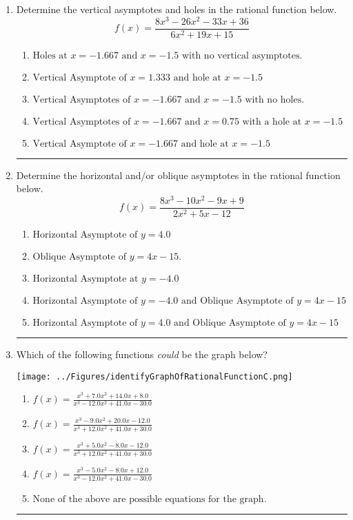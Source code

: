 \documentclass[14pt]{extbook}
\newcommand{\litem}[1]{\item#1\hspace*{-1cm}\rule{\textwidth}{0.4pt}}
\begin{document}
\begin{enumerate}
{\begin{enumerate}[label=\Alph*.]
\end{enumerate} }
\litem{
Determine the vertical asymptotes and holes in the rational function below.\[ f(x) = \frac{8x^{3} -26 x^{2} -33 x + 36}{6x^{2} +19 x + 15} \]\begin{enumerate}[label=\Alph*.]
\item \( \text{Holes at } x = -1.667 \text{ and } x = -1.5 \text{ with no vertical asymptotes.} \)
\item \( \text{Vertical Asymptote of } x = 1.333 \text{ and hole at } x = -1.5 \)
\item \( \text{Vertical Asymptotes of } x = -1.667 \text{ and } x = -1.5 \text{ with no holes.} \)
\item \( \text{Vertical Asymptotes of } x = -1.667 \text{ and } x = 0.75 \text{ with a hole at } x = -1.5 \)
\item \( \text{Vertical Asymptote of } x = -1.667 \text{ and hole at } x = -1.5 \)

\end{enumerate} }
\litem{
Determine the horizontal and/or oblique asymptotes in the rational function below.\[ f(x) = \frac{8x^{3} -10 x^{2} -9 x + 9}{2x^{2} +5 x -12} \]\begin{enumerate}[label=\Alph*.]
\item \( \text{Horizontal Asymptote of } y = 4.0  \)
\item \( \text{Oblique Asymptote of } y = 4x -15. \)
\item \( \text{Horizontal Asymptote at } y = -4.0 \)
\item \( \text{Horizontal Asymptote of } y = -4.0 \text{ and Oblique Asymptote of } y = 4x -15 \)
\item \( \text{Horizontal Asymptote of } y = 4.0 \text{ and Oblique Asymptote of } y = 4x -15 \)

\end{enumerate} }
\litem{
Which of the following functions \textit{could} be the graph below?
\begin{center}
    \texttt{[image: ../Figures/identifyGraphOfRationalFunctionC.png]}
\end{center}
\begin{enumerate}[label=\Alph*.]
\item \( f(x)=\frac{x^{3} +7.0 x^{2} +14.0 x + 8.0}{x^{3} -12.0 x^{2} +41.0 x -30.0} \)
\item \( f(x)=\frac{x^{3} -9.0 x^{2} +20.0 x -12.0}{x^{3} +12.0 x^{2} +41.0 x + 30.0} \)
\item \( f(x)=\frac{x^{3} +5.0 x^{2} -8.0 x -12.0}{x^{3} +12.0 x^{2} +41.0 x + 30.0} \)
\item \( f(x)=\frac{x^{3} -5.0 x^{2} -8.0 x + 12.0}{x^{3} -12.0 x^{2} +41.0 x -30.0} \)
\item \( \text{None of the above are possible equations for the graph.} \)


\end{enumerate}}
\end{enumerate}
\end{document}
